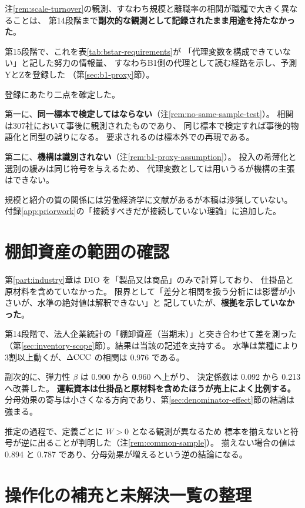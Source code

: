注\ref{rem:scale-turnover}の観測、すなわち規模と離職率の相関が職種で大きく異なることは、
第14段階まで\textbf{副次的な観測として記録されたまま用途を持たなかった}。

第15段階で、これを表\ref{tab:bstar-requirements}が
「代理変数を構成できていない」と記した努力の情報量、
すなわちB1側の代理として読む経路を示し、予測YとZを登録した
（第\ref{sec:b1-proxy}節）。

登録にあたり二点を確定した。

第一に、\textbf{同一標本で検定してはならない}（注\ref{rem:no-same-sample-test}）。
相関は307社において事後に観測されたものであり、
同じ標本で検定すれば事後的物語化と同型の誤りになる。
要求されるのは標本外での再現である。

第二に、\textbf{機構は識別されない}（注\ref{rem:b1-proxy-assumption}）。
投入の希薄化と選別の緩みは同じ符号を与えるため、
代理変数としては用いうるが機構の主張はできない。

規模と紹介の質の関係には労働経済学に文献があるが本稿は渉猟していない。
付録\ref{app:priorwork}の「接続すべきだが接続していない理論」に追加した。

\section{棚卸資産の範囲の確認}

第\ref{part:industry}章は $\mathrm{DIO}$ を「製品又は商品」のみで計算しており、
仕掛品と原材料を含めていなかった。
限界として「差分と相関を扱う分析には影響が小さいが、水準の絶対値は解釈できない」と
記していたが、\textbf{根拠を示していなかった}。

第14段階で、法人企業統計の「棚卸資産（当期末）」と突き合わせて差を測った
（第\ref{sec:inventory-scope}節）。結果は当該の記述を支持する。
水準は業種により3割以上動くが、$\Delta\mathrm{CCC}$ の相関は 0.976 である。

副次的に、弾力性 $\beta$ は 0.900 から 0.960 へ上がり、
決定係数は 0.092 から 0.213 へ改善した。
\textbf{運転資本は仕掛品と原材料を含めたほうが売上によく比例する。}
分母効果の寄与は小さくなる方向であり、第\ref{sec:denominator-effect}節の結論は強まる。

推定の過程で、定義ごとに $W>0$ となる観測が異なるため
標本を揃えないと符号が逆に出ることが判明した（注\ref{rem:common-sample}）。
揃えない場合の値は 0.894 と 0.787 であり、分母効果が増えるという逆の結論になる。

\section{操作化の補充と未解決一覧の整理}

